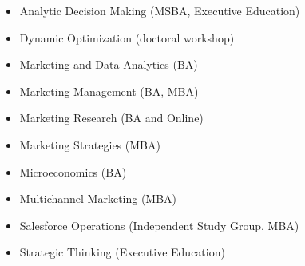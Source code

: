 \documentclass[10pt]{article}
\begin{document}
\begin{itemize}
\item[] Analytic Decision Making (MSBA, Executive Education)
\item[] Dynamic Optimization (doctoral workshop)
\item[] Marketing and Data Analytics (BA)
\item[] Marketing Management (BA, MBA)
\item[] Marketing Research (BA and Online)
\item[] Marketing Strategies (MBA)
\item[] Microeconomics (BA)
\item[] Multichannel Marketing (MBA)
\item[] Salesforce Operations (Independent Study Group, MBA)
\item[] Strategic Thinking (Executive Education)
 \end{itemize}
\end{document}
